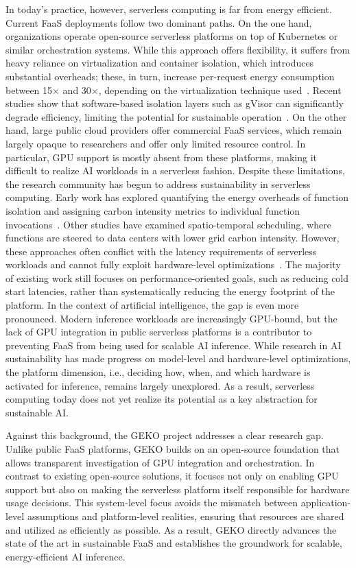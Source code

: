 In today's practice, however, serverless computing is far from energy efficient.
Current FaaS deployments follow two dominant paths. 
On the one hand, organizations operate open-source serverless platforms on top of Kubernetes or similar orchestration systems. 
While this approach offers flexibility, it suffers from heavy reliance on virtualization and container isolation, which introduces substantial overheads; these, in turn, increase per-request energy consumption between 15$\times$ and 30$\times$, depending on the virtualization technique used~\cite{sharma_challenges_2023}.
Recent studies show that software-based isolation layers such as gVisor can significantly degrade efficiency, limiting the potential for sustainable operation~\cite{young_true_nodate}. 
On the other hand, large public cloud providers offer commercial FaaS services, which remain largely opaque to researchers and offer only limited resource control.%
In particular, GPU support is mostly absent from these platforms, making it difficult to realize AI workloads in a serverless fashion.
Despite these limitations, the research community has begun to address sustainability in serverless computing. 
Early work has explored quantifying the energy overheads of function isolation and assigning carbon intensity metrics to individual function invocations~\cite{sharma_accountable_2024}.
Other studies have examined spatio-temporal scheduling, where functions are steered to data centers with lower grid carbon intensity. %
However, these approaches often conflict with the latency requirements of serverless workloads and cannot fully exploit hardware-level optimizations~\cite{sukprasert_limitations_2024}. 
The majority of existing work still focuses on performance-oriented goals, such as reducing cold start latencies, rather than systematically reducing the energy footprint of the platform.%
In the context of artificial intelligence, the gap is even more pronounced. 
Modern inference workloads are increasingly GPU-bound, but the lack of GPU integration in public serverless platforms is a contributor to preventing FaaS from being used for scalable AI inference. 
While research in AI sustainability has made progress on model-level and hardware-level optimizations, the platform dimension, i.e., deciding how, when, and which hardware is activated for inference, remains largely unexplored. 
As a result, serverless computing today does not yet realize its potential as a key abstraction for sustainable AI.

Against this background, the GEKO project addresses a clear research gap.
Unlike public FaaS platforms, GEKO builds on an open-source foundation that allows transparent investigation of GPU integration and orchestration. 
In contrast to existing open-source solutions, it focuses not only on enabling GPU support but also on making the serverless platform itself responsible for hardware usage decisions. 
This system-level focus avoids the mismatch between application-level assumptions and platform-level realities, ensuring that resources are shared and utilized as efficiently as possible. 
As a result, GEKO directly advances the state of the art in sustainable FaaS and establishes the groundwork for scalable, energy-efficient AI inference.

